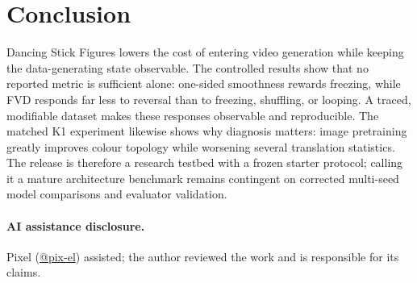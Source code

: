 \documentclass[10pt,twocolumn]{article}
\begin{document}
\section{Conclusion}
Dancing Stick Figures lowers the cost of entering video generation while keeping the data-generating state observable.
The controlled results show that no reported metric is sufficient alone: one-sided smoothness rewards freezing, while
FVD responds far less to reversal than to freezing, shuffling, or looping. A traced, modifiable dataset makes these
responses observable and reproducible. The matched K1 experiment likewise shows why diagnosis matters: image
pretraining greatly improves colour topology while worsening several translation statistics. The release is therefore
a research testbed with a frozen starter protocol; calling it a
mature architecture benchmark remains contingent on corrected multi-seed model comparisons and evaluator validation.

\paragraph{AI assistance disclosure.} Pixel (\href{https://sprited.ai}{@pix-el}) assisted; the author reviewed the
work and is responsible for its claims.
\end{document}

